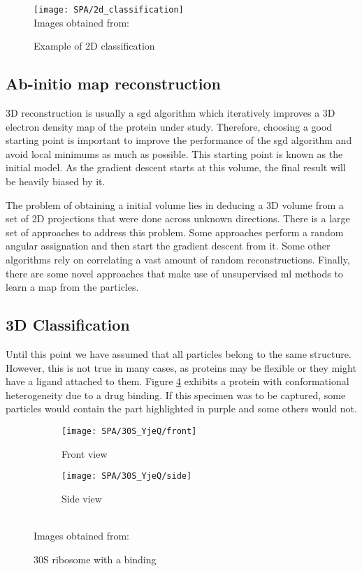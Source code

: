 \documentclass[../main.tex]{subfiles}
\begin{document}
\begin{figure}[htbp]
    \centering
    \texttt{[image: SPA/2d\_classification]}\\
    Images obtained from: \cite{greg}
    \caption{Example of 2D classification}
    \label{fig:2:2d_classification}
\end{figure}

\subsection{Ab-initio map reconstruction}
3D reconstruction is usually a \gls{sgd} algorithm which iteratively improves a 3D electron density map of the protein under study. Therefore, choosing a good starting point is important to improve the performance of the \gls{sgd} algorithm and avoid local minimums as much as possible. This starting point is known as the initial model. As the gradient descent starts at this volume, the final result will be heavily biased by it\cite{sigworth2015}.

The problem of obtaining a initial volume lies in deducing a 3D volume from a set of 2D projections that were done across unknown directions. There is a large set of approaches to address this problem. Some approaches perform a random angular assignation and then start the gradient descent from it. Some other algorithms rely on correlating a vast amount of random reconstructions\cite{vargas2014}. Finally, there are some novel approaches that make use of unsupervised \gls{ml} methods to learn a map from the particles\cite{levy2022}.

\subsection{3D Classification}
Until this point we have assumed that all particles belong to the same structure. However, this is not true in many cases, as proteins may be flexible or they might have a ligand attached to them. Figure \ref{fig:2:30s_yjeq} exhibits a protein with conformational heterogeneity due to a drug binding. If this specimen was to be captured, some particles would contain the part highlighted in purple and some others would not.

\begin{figure}[htbp]
    \centering
    \begin{subfigure}[b]{0.3\textwidth}
         \centering
         \texttt{[image: SPA/30S\_YjeQ/front]}
         \caption{Front view}
         \label{fig:2:30s_yjeq:front}
    \end{subfigure}
    \begin{subfigure}[b]{0.3\textwidth}
         \centering
         \texttt{[image: SPA/30S\_YjeQ/side]}
         \caption{Side view}
         \label{fig:2:30s_yjeq:side}
    \end{subfigure}\\
    Images obtained from: \cite{razi2017}
    \caption{30S ribosome with a binding}
    \label{fig:2:30s_yjeq}
\end{figure}
\end{document}
